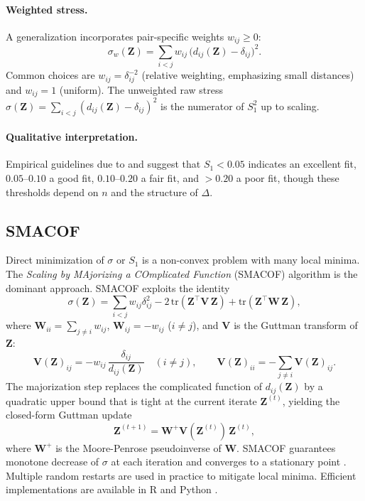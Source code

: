 \documentclass[11pt]{article}
\theoremstyle{definition}
\newcommand{\bZ}{\mathbf{Z}}
\newcommand{\bV}{\mathbf{V}}
\newcommand{\bW}{\mathbf{W}}
\newcommand{\StressOne}{S_1}
\begin{document}
\paragraph{Weighted stress.}
A generalization incorporates pair-specific weights $w_{ij} \geq 0$:
\begin{equation}
  \sigma_w(\bZ)
  = \sum_{i < j} w_{ij}\,\bigl(d_{ij}(\bZ) - \delta_{ij}\bigr)^2.
  \label{eq:weighted_stress}
\end{equation}
Common choices are $w_{ij} = \delta_{ij}^{-2}$ (relative weighting,
emphasizing small distances) and $w_{ij} = 1$ (uniform).  The unweighted
raw stress $\sigma(\bZ) = \sum_{i<j}(d_{ij}(\bZ) - \delta_{ij})^2$
is the numerator of $\StressOne^2$ up to scaling.

\paragraph{Qualitative interpretation.}
Empirical guidelines due to \citet{kruskal1964nonmetric} and
\citet{borg2005modern} suggest that $\StressOne < 0.05$ indicates an
excellent fit, $0.05$--$0.10$ a good fit, $0.10$--$0.20$ a fair fit, and
$> 0.20$ a poor fit, though these thresholds depend on $n$ and the
structure of $\Delta$.

\subsection{SMACOF}
\label{sec:smacof}

Direct minimization of $\sigma$ or $\StressOne$ is a non-convex problem
with many local minima.  The \emph{Scaling by MAjorizing a COmplicated
  Function} (SMACOF) algorithm \citep{deleeuw1977applications,
  deleeuw2009multidimensional} is the dominant approach.  SMACOF exploits
the identity
\begin{equation}
  \sigma(\bZ) = \sum_{i<j}w_{ij}\delta_{ij}^2
  - 2\,\mathrm{tr}(\bZ^\top \bV\,\bZ)
  + \mathrm{tr}(\bZ^\top \bW\,\bZ),
  \label{eq:smacof_decomp}
\end{equation}
where $\bW_{ii} = \sum_{j \neq i} w_{ij}$, $\bW_{ij} = -w_{ij}$ ($i \neq
j$), and $\bV$ is the Guttman transform of $\bZ$:
\begin{equation}
  \bV(\bZ)_{ij} = -w_{ij}\,\frac{\delta_{ij}}{d_{ij}(\bZ)}\quad(i \neq j),
  \qquad
  \bV(\bZ)_{ii} = -\sum_{j \neq i} \bV(\bZ)_{ij}.
  \label{eq:guttman}
\end{equation}
The majorization step replaces the complicated function of $d_{ij}(\bZ)$
by a quadratic upper bound that is tight at the current iterate $\bZ^{(t)}$,
yielding the closed-form Guttman update
\begin{equation}
  \bZ^{(t+1)} = \bW^+ \bV(\bZ^{(t)})\,\bZ^{(t)},
  \label{eq:guttman_update}
\end{equation}
where $\bW^+$ is the Moore-Penrose pseudoinverse of $\bW$.  SMACOF
guarantees monotone decrease of $\sigma$ at each iteration and converges
to a stationary point \citep{deleeuw2009multidimensional}.  Multiple random
restarts are used in practice to mitigate local minima.  Efficient
implementations are available in R \citep{deleeuw2009multidimensional}
and Python \citep{pedregosa2011scikit}.
\end{document}
